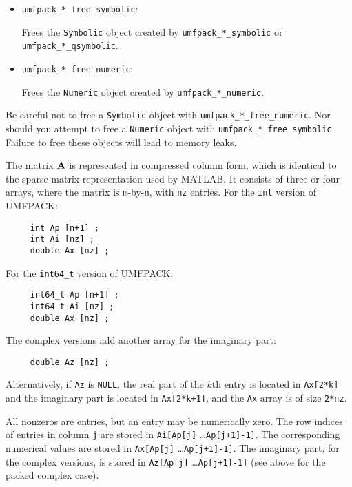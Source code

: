 \documentclass[11pt]{article}
\newcommand{\m}[1]{{\bf{#1}}}       %
\begin{document}
\begin{itemize}
\item {\tt umfpack\_*\_free\_symbolic}:

    Frees the {\tt Symbolic} object created by {\tt umfpack\_*\_symbolic}
    or {\tt umfpack\_*\_qsymbolic}.

\item {\tt umfpack\_*\_free\_numeric}:

    Frees the {\tt Numeric} object created by {\tt umfpack\_*\_numeric}.

\end{itemize}

Be careful not to free a {\tt Symbolic} object with
{\tt umfpack\_*\_free\_numeric}.  Nor should you attempt to free a {\tt Numeric}
object with {\tt umfpack\_*\_free\_symbolic}.
Failure to free these objects will lead to memory leaks.

The matrix $\m{A}$ is represented in compressed column form, which is
identical to the sparse matrix representation used by MATLAB.  It consists
of three or four arrays, where the matrix is {\tt m}-by-{\tt n},
with {\tt nz} entries.  For the {\tt int} version of UMFPACK:

{\footnotesize
\begin{verbatim}
     int Ap [n+1] ;
     int Ai [nz] ;
     double Ax [nz] ;
\end{verbatim}
}

For the \verb'int64_t' version of UMFPACK:

{\footnotesize
\begin{verbatim}
     int64_t Ap [n+1] ;
     int64_t Ai [nz] ;
     double Ax [nz] ;
\end{verbatim}
}

The complex versions add another array for the imaginary part:

{\footnotesize
\begin{verbatim}
     double Az [nz] ;
\end{verbatim}
}

Alternatively, if {\tt Az} is {\tt NULL},
the real part of the $k$th entry is located in
{\tt Ax[2*k]} and the imaginary part is located in
{\tt Ax[2*k+1]}, and the {\tt Ax} array is of size {\tt 2*nz}.

All nonzeros are entries, but an entry may be numerically zero.  The row indices
of entries in column {\tt j} are stored in
    {\tt Ai[Ap[j]} \ldots {\tt Ap[j+1]-1]}.
The corresponding numerical values are stored in
    {\tt Ax[Ap[j]} \ldots {\tt Ap[j+1]-1]}.
The imaginary part, for the complex versions, is stored in
    {\tt Az[Ap[j]} \ldots {\tt Ap[j+1]-1]}
    (see above for the packed complex case).
\end{document}
